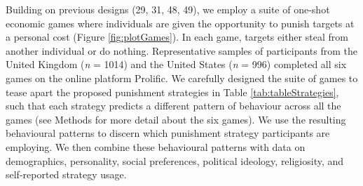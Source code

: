 \documentclass[
  english,
  man, donotrepeattitle,floatsintext]{apa6}
\begin{document}
Building on previous designs (29, 31, 48, 49), we employ a suite of one-shot economic games where individuals
are given the opportunity to punish targets at a personal cost (Figure
\ref{fig:plotGames}). In each game, targets either steal from another
individual or do nothing. Representative samples of participants from the United
Kingdom (\emph{n} = 1014) and the
United States (\emph{n} = 996)
completed all six games on the online platform Prolific. We carefully designed
the suite of games to tease apart the proposed punishment strategies in Table
\ref{tab:tableStrategies}, such that each strategy predicts a different pattern
of behaviour across all the games (see Methods for more detail about the six
games). We use the resulting behavioural patterns to discern which punishment
strategy participants are employing. We then combine these behavioural patterns
with data on demographics, personality, social preferences, political ideology,
religiosity, and self-reported strategy usage.
\end{document}
